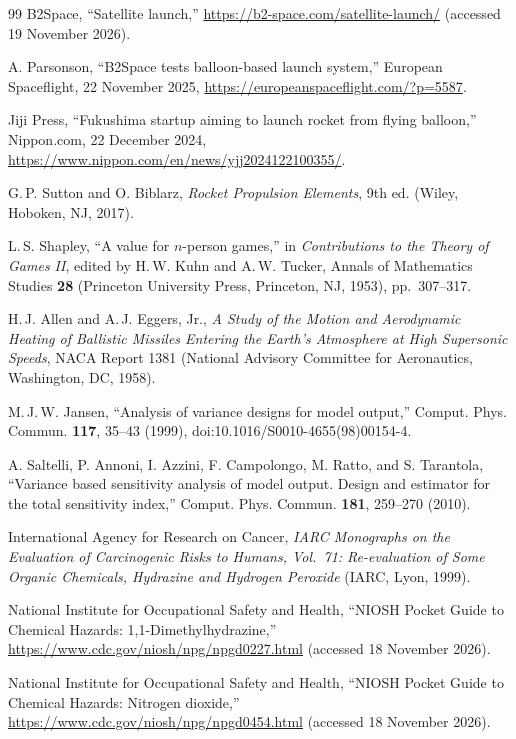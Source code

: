 \documentclass[11pt,a4paper]{article}
\begin{document}
\begin{thebibliography}{99}
 B2Space, ``Satellite launch,'' \url{https://b2-space.com/satellite-launch/} (accessed 19 November 2026).

 A. Parsonson, ``B2Space tests balloon-based launch system,'' European Spaceflight, 22 November 2025, \url{https://europeanspaceflight.com/?p=5587}.

 Jiji Press, ``Fukushima startup aiming to launch rocket from flying balloon,'' Nippon.com, 22 December 2024, \url{https://www.nippon.com/en/news/yjj2024122100355/}.

 G.\,P. Sutton and O. Biblarz, \emph{Rocket Propulsion Elements}, 9th ed. (Wiley, Hoboken, NJ, 2017).

 L.\,S. Shapley, ``A value for $n$-person games,'' in \emph{Contributions to the Theory of Games II}, edited by H.\,W. Kuhn and A.\,W. Tucker, Annals of Mathematics Studies \textbf{28} (Princeton University Press, Princeton, NJ, 1953), pp.~307--317.

 H.\,J. Allen and A.\,J. Eggers, Jr., \emph{A Study of the Motion and Aerodynamic Heating of Ballistic Missiles Entering the Earth's Atmosphere at High Supersonic Speeds}, NACA Report 1381 (National Advisory Committee for Aeronautics, Washington, DC, 1958).

 M.\,J.\,W. Jansen, ``Analysis of variance designs for model output,'' Comput. Phys. Commun. \textbf{117}, 35--43 (1999), doi:10.1016/S0010-4655(98)00154-4.

 A. Saltelli, P. Annoni, I. Azzini, F. Campolongo, M. Ratto, and S. Tarantola, ``Variance based sensitivity analysis of model output. Design and estimator for the total sensitivity index,'' Comput. Phys. Commun. \textbf{181}, 259--270 (2010).

 International Agency for Research on Cancer, \emph{IARC Monographs on the Evaluation of Carcinogenic Risks to Humans, Vol.~71: Re-evaluation of Some Organic Chemicals, Hydrazine and Hydrogen Peroxide} (IARC, Lyon, 1999).

 National Institute for Occupational Safety and Health, ``NIOSH Pocket Guide to Chemical Hazards: 1,1-Dimethylhydrazine,'' \url{https://www.cdc.gov/niosh/npg/npgd0227.html} (accessed 18 November 2026).

 National Institute for Occupational Safety and Health, ``NIOSH Pocket Guide to Chemical Hazards: Nitrogen dioxide,'' \url{https://www.cdc.gov/niosh/npg/npgd0454.html} (accessed 18 November 2026).

\end{thebibliography}
\end{document}
